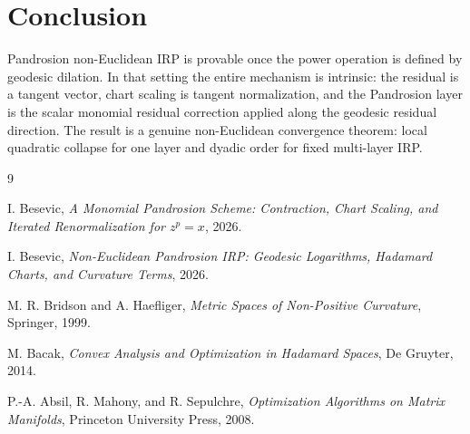 \documentclass[10pt,a4paper]{article}
\theoremstyle{plain}
\theoremstyle{definition}
\begin{document}
\section{Conclusion}

Pandrosion non-Euclidean IRP is provable once the power operation is defined by
geodesic dilation.  In that setting the entire mechanism is intrinsic: the
residual is a tangent vector, chart scaling is tangent normalization, and the
Pandrosion layer is the scalar monomial residual correction applied along the
geodesic residual direction.  The result is a genuine non-Euclidean convergence
theorem: local quadratic collapse for one layer and dyadic order for fixed
multi-layer IRP.

\begin{thebibliography}{9}

I. Besevic,
\emph{A Monomial Pandrosion Scheme: Contraction, Chart Scaling, and Iterated
Renormalization for $z^p=x$}, 2026.

I. Besevic,
\emph{Non-Euclidean Pandrosion IRP: Geodesic Logarithms, Hadamard Charts, and
Curvature Terms}, 2026.

M. R. Bridson and A. Haefliger,
\emph{Metric Spaces of Non-Positive Curvature},
Springer, 1999.

M. Bacak,
\emph{Convex Analysis and Optimization in Hadamard Spaces},
De Gruyter, 2014.

P.-A. Absil, R. Mahony, and R. Sepulchre,
\emph{Optimization Algorithms on Matrix Manifolds},
Princeton University Press, 2008.

\end{thebibliography}
\end{document}
